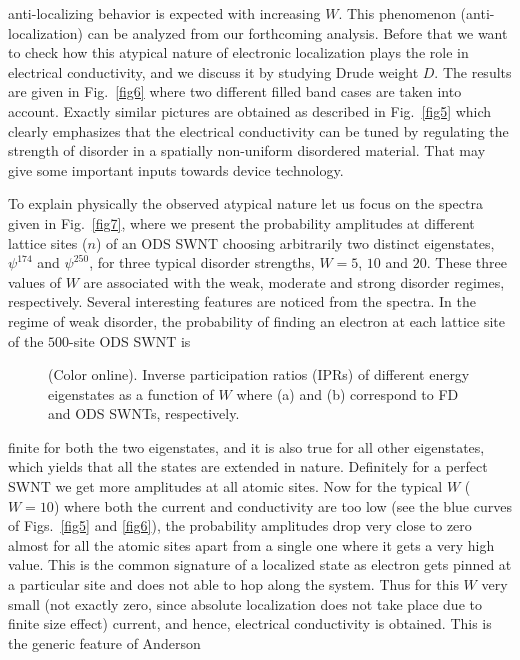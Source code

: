 \documentclass[prb,aps,twocolumn,amsmath,amssymb,floatfix,
superscriptaddress]{revtex4}
\begin{document}
anti-localizing behavior is expected with increasing $W$. This phenomenon 
(anti-localization) can be analyzed from our forthcoming analysis. Before that
we want to check how this atypical nature of electronic localization plays the
role in electrical conductivity, and we discuss it by studying Drude weight
$D$. The results are given in Fig.~\ref{fig6} where two different filled band
cases are taken into account. Exactly similar pictures are obtained as described
in Fig.~\ref{fig5} which clearly emphasizes that the electrical conductivity 
can be tuned by regulating the strength of disorder in a spatially non-uniform
disordered material. That may give some important inputs towards device technology.

To explain physically the observed atypical nature let us focus on the  
spectra given in Fig.~\ref{fig7}, where we present the probability amplitudes
at different lattice sites ($n$) of an ODS SWNT choosing arbitrarily two 
distinct
eigenstates, $\psi^{174}$ and $\psi^{250}$, for three typical disorder strengths,
$W=5$, $10$ and $20$. These three values of $W$ are associated with the weak,
moderate and strong disorder regimes, respectively. Several interesting features 
are noticed from the spectra. In the regime of weak disorder, the probability 
of finding an electron at each lattice site of the $500$-site ODS SWNT is 
\begin{figure}[ht]
{\centering {}\par}
\caption{(Color online). Inverse participation ratios (IPRs) of different energy
eigenstates as a function of $W$ where (a) and (b) correspond to FD and ODS 
SWNTs, respectively.}
\label{fig8}
\end{figure}
finite for both the two eigenstates, and it is also true for all other 
eigenstates, which yields that all the states are extended in nature. 
Definitely for a perfect SWNT 
we get more amplitudes at all atomic sites. Now for the typical $W$ ($W=10$)
where both the current and conductivity are too low (see the blue curves of 
Figs.~\ref{fig5} and \ref{fig6}), the probability amplitudes drop very close to 
zero almost for all the atomic sites apart from a single one where it gets a 
very high value. This is the common signature of a localized state as electron 
gets pinned at a particular site and does not able to hop along the system. 
Thus for this $W$ very small (not exactly zero, since absolute localization does
not take place due to finite size effect) current, and hence, electrical 
conductivity is obtained. This is the generic feature of Anderson 
\end{document}
